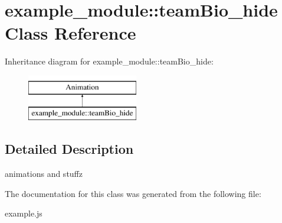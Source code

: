 \hypertarget{classexample__module_1_1teamBio__hide}{\section{example\-\_\-module\-:\-:team\-Bio\-\_\-hide Class Reference}
\label{classexample__module_1_1teamBio__hide}
}
Inheritance diagram for example\-\_\-module\-:\-:team\-Bio\-\_\-hide\-:\begin{figure}[H]
\begin{center}
\leavevmode
\includegraphics[height=2.000000cm]{classexample__module_1_1teamBio__hide}
\end{center}
\end{figure}


\subsection{Detailed Description}
animations and stuffz 

The documentation for this class was generated from the following file\-:\begin{DoxyCompactItemize}
\item 
example.\-js\end{DoxyCompactItemize}
